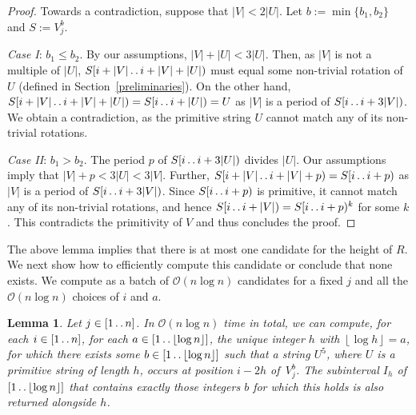 \documentclass[11pt,letterpaper]{article}
\newcommand{\cO}{\mathcal{O}}
\newcommand{\floor}[1]{\left\lfloor #1 \right\rfloor}
\def\dd{\mathinner{.\,.}}
\newcommand{\vmeta}[2]{V_{#1}^{#2}}
\newtheorem{lemma}[theorem]{Lemma}
\begin{document}
\begin{proof}
Towards a contradiction, suppose that $|V|<2|U|$.
Let $b:=\min\{b_1,b_2\}$ and $S:=\vmeta{j}{b}$.

\emph{Case I}: $b_1 \leq b_2$.
By our assumptions, $|V|+|U| < 3|U|$.
Then, as $|V|$ is not a multiple of $|U|$, $S[i+|V| \dd i+|V|+|U|)$ must equal some non-trivial rotation of $U$ (defined in  Section~\ref{preliminaries}).
On the other hand, $S[i+|V| \dd i+|V|+|U|)=S[i \dd i+|U|)=U$ as $|V|$ is a period of $S[i \dd i+3|V|)$.
We obtain a contradiction, as the primitive string $U$ cannot match any of its non-trivial rotations.

\emph{Case II}: $b_1 > b_2$.
The period $p$ of $S[i \dd i+3|U|)$ divides $|U|$.
Our assumptions imply that $|V|+p < 3|U| < 3|V|$.
Further, $S[i+|V| \dd i+|V|+p)=S[i \dd i+p)$ as $|V|$ is a period of $S[i \dd i+3|V|)$.
Since $S[i \dd i+p)$ is primitive, it cannot match any of its non-trivial rotations, and hence $S[i \dd i+|V|)=S[i \dd i+p)^k$ for some $k$. This contradicts the primitivity of $V$ and thus concludes the proof.
\end{proof}

The above lemma implies that there is at most one candidate for the height of $R$.
We next show how to efficiently compute this candidate or conclude that none exists.
We compute as a batch of $\cO(n \log n)$ candidates for a fixed $j$ and all the $\cO(n\log n)$ choices of $i$ and $a$.

\begin{lemma}\label{lem:vert_run}
Let $j \in [1 \dd n]$.
In $\cO(n \log n)$ time in total, we can compute, for each $i \in [1 \dd n]$, for each $a \in [1 \dd \floor{\log n}]$, the unique integer $h$ with $\floor{\log h}=a$, for which there exists some $b \in [1 \dd \floor{\log n}]$ such that a string $U^5$, where $U$ is a primitive string of length $h$, occurs at position $i-2h$ of~$\vmeta{j}{b}$. The subinterval $I_h$ of $[1 \dd \floor{\log n}]$ that contains exactly those integers $b$ for which this holds is also returned alongside $h$.
\end{lemma}
\end{document}
